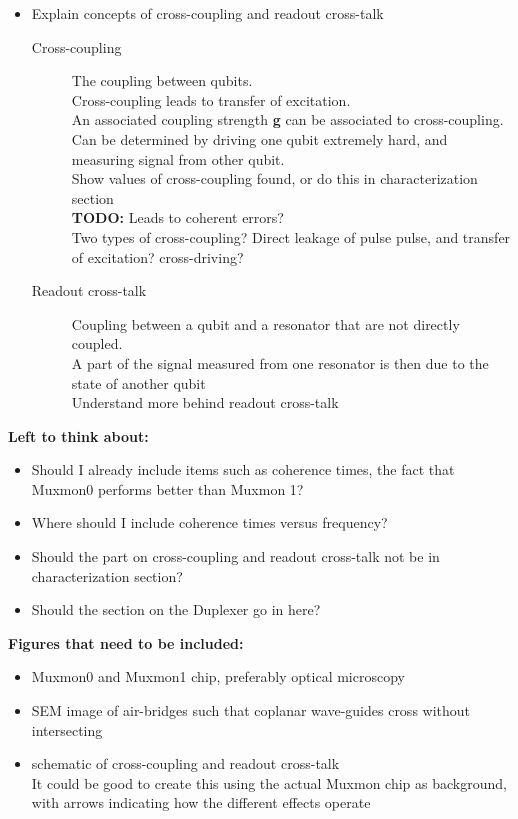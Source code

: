\documentclass[12pt]{report}
\begin{document}
\begin{itemize}
    \item Explain concepts of cross-coupling and readout cross-talk
    \begin{description}
        \item[Cross-coupling] The coupling between qubits. \\
                              Cross-coupling leads to transfer of excitation.\\
                              An associated coupling strength \textbf{g} can be associated to cross-coupling.\\
                              Can be determined by driving one qubit extremely hard, and measuring signal from other qubit.\\
                               Show values of cross-coupling found, or do this in characterization section \\
                              \textbf{TODO:} Leads to coherent errors? \\
                               Two types of cross-coupling? Direct leakage of pulse pulse, and transfer of excitation? cross-driving?
        \item[Readout cross-talk] Coupling between a qubit and a resonator that are not directly coupled.\\
                                  A part of the signal measured from one resonator is then due to the state of another qubit \\
                                   Understand more behind readout cross-talk
    \end{description}

\end{itemize}

\textbf{Left to think about:}
\begin{itemize}
    \item Should I already include items such as coherence times, the fact that Muxmon0 performs better than Muxmon 1?
    \item Where should I include coherence times versus frequency?
    \item Should the part on cross-coupling and readout cross-talk not be in characterization section?
    \item Should the section on the Duplexer go in here?
\end{itemize}

\textbf{Figures that need to be included:}
\begin{itemize}
    \item Muxmon0 and Muxmon1 chip, preferably optical microscopy
    \item SEM image of air-bridges such that coplanar wave-guides cross without intersecting
    \item schematic of cross-coupling and readout cross-talk \\
          It could be good to create this using the actual Muxmon chip as background, with arrows indicating how the different effects operate
\end{itemize}
\end{document}
